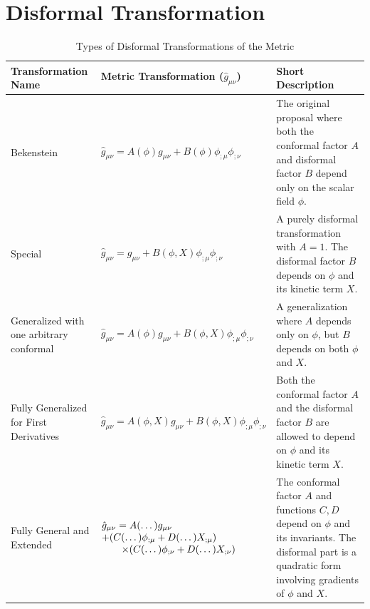 \documentclass[a4paper,11pt]{article}
\begin{document}
\section{Disformal Transformation}
\newpage
\begin{table}[H]
\centering
\caption{Types of Disformal Transformations of the Metric}
\label{tab:disformal}
\small
\renewcommand{\arraystretch}{1.9}

\begin{tabularx}{\textwidth}{@{} p{4.3cm} p{5.8cm} X @{}}
\toprule
\textbf{Transformation Name} & \textbf{Metric Transformation ($\hat{g}_{\mu \nu}$)} & \textbf{Short Description} \\
\midrule

Bekenstein &
$\hat{g}_{\mu \nu} = A(\phi)g_{\mu \nu} + B(\phi)\phi_{;\mu}\phi_{;\nu}$ &
The original proposal where both the conformal factor $A$ and disformal factor $B$ depend only on the scalar field $\phi$. \\

Special &
$\hat{g}_{\mu \nu} = g_{\mu \nu} + B(\phi, X)\phi_{;\mu}\phi_{;\nu}$ &
A purely disformal transformation with $A=1$. The disformal factor $B$ depends on $\phi$ and its kinetic term $X$. \\

Generalized with one arbitrary conformal &
$\hat{g}_{\mu \nu} = A(\phi)g_{\mu \nu} + B(\phi, X)\phi_{;\mu}\phi_{;\nu}$ &
A generalization where $A$ depends only on $\phi$, but $B$ depends on both $\phi$ and $X$. \\

Fully Generalized for First Derivatives &
$\hat{g}_{\mu \nu} = A(\phi, X)g_{\mu \nu} + B(\phi, X)\phi_{;\mu}\phi_{;\nu}$ &
Both the conformal factor $A$ and the disformal factor $B$ are allowed to depend on $\phi$ and its kinetic term $X$. \\

Fully General and Extended &
$\begin{array}[t]{@{}l@{}}
\hat{g}_{\mu \nu} = A(\dots)g_{\mu \nu} \\ + (C(\dots)\phi_{;\mu} + D(\dots)X_{;\mu}) \\
\hspace*{2em} \times (C(\dots)\phi_{;\nu} + D(\dots)X_{;\nu})
\end{array}$ &
The conformal factor $A$ and functions $C, D$ depend on $\phi$ and its invariants. The disformal part is a quadratic form involving gradients of $\phi$ and $X$. \\


\end{tabularx}
\end{table}
\end{document}
